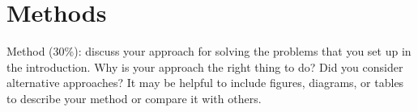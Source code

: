\section{Methods}
Method (30\%): discuss your approach for solving the problems that you set up in the introduction. Why is your approach the right thing to do? Did you consider alternative approaches? It may be helpful to include figures, diagrams, or tables to describe your method or compare it with others.
